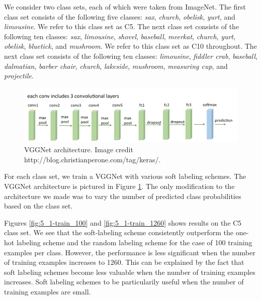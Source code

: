 
We consider two class sets, each of which were taken from ImageNet. The first
class set consists of the following five classes:
\emph{sax},
\emph{church},
\emph{obelisk},
\emph{yurt}, and
\emph{limousine}.
We refer to this class set as C5.
The next class set consists of the following ten classes:
\emph{sax},
\emph{limousine},
\emph{shovel},
\emph{baseball},
\emph{meerkat},
\emph{church},
\emph{yurt},
\emph{obelisk},
\emph{bluetick}, and
\emph{mushroom}.
We refer to this class set as C10 throughout.
The next class set consists of the following ten classes:
\emph{limousine},
\emph{fiddler crab},
\emph{baseball},
\emph{dalmatian},
\emph{barber chair},
\emph{church},
\emph{lakeside},
\emph{mushroom},
\emph{measuring cup}, and
\emph{projectile}.

\begin{figure}[t]
  \centering
  \includegraphics[width=1.0\textwidth]{figs/vgg16arch.png}
  \caption{
      VGGNet architecture. Image credit
      http://blog.christianperone.com/tag/keras/.
  }
  \label{fig:vgg16arch}
\end{figure}

For each class set, we train a VGGNet with various soft labeling schemes. The
VGGNet architecture is pictured in Figure \ref{fig:vgg16arch}. The only
modification to the architecture we made was to vary the number of
predicted class probabilities based on the class set.

Figures \ref{fig:5_1-train_100} and \ref{fig:5_1-train_1260} shows results on
the C5 class set. We see that the soft-labeling scheme consistently outperform
the one-hot labeling scheme and the random labeling scheme for the case of 100
training examples per class. However, the performance is less significant when
the number of training examples increases to 1260. This can be explained by the
fact that soft labeling schemes become less valuable when the number of training
examples increases. Soft labeling schemes to be particularily useful when the
number of training examples are small.

